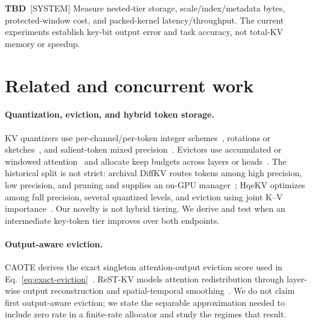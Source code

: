 \documentclass{article}
\newcommand{\tbd}[1]{{\color{tbdcol}\textbf{TBD}~#1}}
\theoremstyle{definition}
\begin{document}
\tbd{[SYSTEM] Measure nested-tier storage, scale/index/metadata bytes, protected-window cost, and packed-kernel latency/throughput. The current experiments establish key-bit output error and task accuracy, not total-KV memory or speedup.}

\section{Related and concurrent work}
\label{sec:related}

\paragraph{Quantization, eviction, and hybrid token storage.}
KV quantizers use per-channel/per-token integer schemes~\citep{liu2024kivi,hooper2024kvquant}, rotations or sketches~\citep{zandieh2025turboquant,zandieh2024qjl}, and salient-token mixed precision~\citep{yang2024mikv,he2024zipcache}.  Evictors use accumulated or windowed attention~\citep{zhang2023h2o,li2024snapkv,liu2023scissorhands,xiao2024streamingllm} and allocate keep budgets across layers or heads~\citep{cai2024pyramidkv,feng2024adakv}.  The historical split is not strict: archival DiffKV routes tokens among high precision, low precision, and pruning and supplies an on-GPU manager~\citep{zhang2025diffkv}; HqeKV optimizes among full precision, several quantized levels, and eviction using joint K--V importance~\citep{wang-etal-2026-hqekv}.  Our novelty is not hybrid tiering.  We derive and test when an intermediate key-token tier improves over both endpoints.

\paragraph{Output-aware eviction.}
CAOTE derives the exact singleton attention-output eviction score used in Eq.~\ref{eq:exact-eviction}~\citep{goel2025caote}.  ReST-KV models attention redistribution through layer-wise output reconstruction and spatial-temporal smoothing~\citep{an2026restkv}.  We do not claim first output-aware eviction; we state the separable approximation needed to include zero rate in a finite-rate allocator and study the regimes that result.
\end{document}
